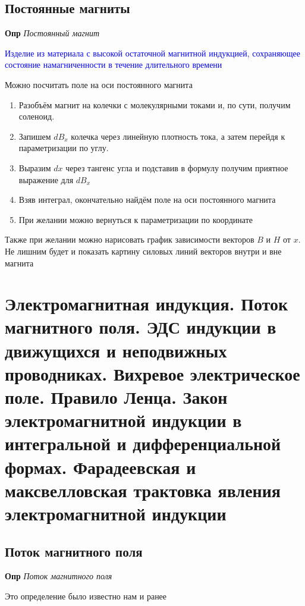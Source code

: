 \documentclass[a4paper, 14pt]{article}
\begin{document}
    \subsection{Постоянные магниты}
    
    \textbf{Опр} \textit{Постоянный магнит}
    
    \textcolor{blue}{Изделие из материала с высокой остаточной магнитной индукцией, сохраняющее состояние
    намагниченности в течение длительного времени}
    
    Можно посчитать поле на оси постоянного магнита
    
    \begin{enumerate}
        \item Разобъём магнит на колечки с молекулярными токами и, по сути, получим соленоид.
        \item Запишем $dB_x$ колечка через линейную плотность тока, а затем перейдя к параметризации по углу.
        \item Выразим $dx$ через тангенс угла и подставив в формулу получим приятное выражение для $dB_x$
        \item Взяв интеграл, окончательно найдём поле на оси постоянного магнита
        \item При желании можно вернуться к параметризации по координате
    \end{enumerate}
    
    Также при желании можно нарисовать график зависимости векторов $B$ и $H$ от $x$.
    Не лишним будет и показать картину силовых линий векторов внутри и вне магнита
    
    \section{Электромагнитная индукция.
    Поток магнитного поля.
    ЭДС индукции в движущихся и неподвижных проводниках.
    Вихревое электрическое поле.
    Правило Ленца.
    Закон электромагнитной индукции в интегральной и дифференциальной формах.
    Фарадеевская и максвелловская трактовка явления электромагнитной индукции}
    
    \subsection{Поток магнитного поля}
    
    \textbf{Опр} \textit{Поток магнитного поля}
    
    Это определение было известно нам и ранее
    
\end{document}
